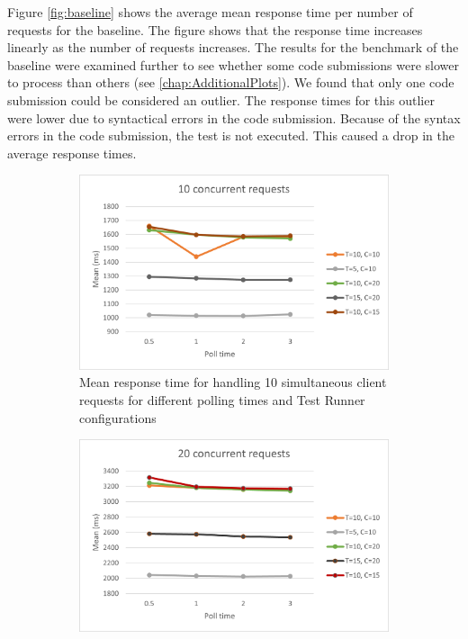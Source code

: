 Figure \ref{fig:baseline} shows the average mean response time per number of requests for the baseline.
The figure shows that the response time increases linearly as the number of requests increases.
The results for the benchmark of the baseline were examined further to see whether some code submissions were slower to process than others (see \ref{chap:AdditionalPlots}).
We found that only one code submission could be considered an outlier.
The response times for this outlier were lower due to syntactical errors in the code submission.
Because of the syntax errors in the code submission, the test is not executed.
This caused a drop in the average response times.

\begin{figure}[H]
  \centering
  \begin{subfigure}[b]{0.45\textwidth}
      \centering
      \includegraphics[width=\textwidth]{images/10.png}
      \caption{Mean response time for handling 10 simultaneous client requests for different polling times and Test Runner configurations}
      \label{fig:resultstart}
  \end{subfigure}
  \hfill
  \begin{subfigure}[b]{0.45\textwidth}
    \centering
    \includegraphics[width=\textwidth]{images/20.png}

\end{subfigure}
\end{figure}
